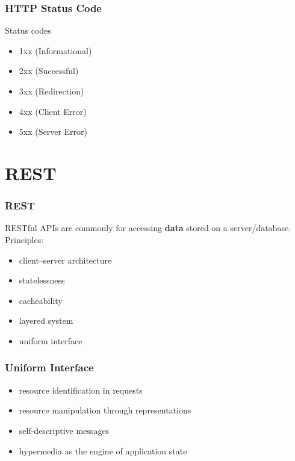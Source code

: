 \begin{frame}[fragile]\frametitle{HTTP Status Code}
\color{structure}
Status codes
\begin{itemize}
  \item  1xx (Informational)
  \item  2xx (Successful)
  \item  3xx (Redirection)
  \item  4xx (Client Error)
  \item  5xx (Server Error)
\end{itemize}
\end{frame}

\section{REST}
\begin{frame}[fragile]\frametitle{REST}
RESTful APIs are commonly for accessing {\bf data} stored on a server/database.
\vspace{3mm}
\\Principles:
\begin{itemize}
  \item client–server architecture
  \item statelessness
  \item cacheability
  \item layered system
  \item uniform interface
\end{itemize}
\end{frame}

\begin{frame}[fragile]\frametitle{Uniform Interface}
\begin{itemize}
 \item resource identification in requests
 \item resource manipulation through representations
 \item self-descriptive messages
 \item hypermedia as the engine of application state
\end{itemize}
\end{frame}

